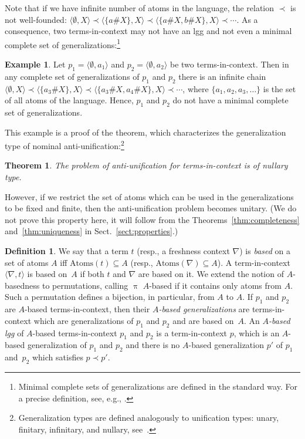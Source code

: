 \documentclass[11pt,a4paper]{amsart}
\newtheorem{theorem}{Theorem}
\theoremstyle{definition}
\newtheorem{definition}{Definition}
\newtheorem{example}{Example}
\newcommand\ppi{\uppi}
\newcommand{\np}[2]{\langle #1, \allowbreak #2\rangle}
\newcommand{\atoms}{\mathrm{Atoms}}
\begin{document}
Note that if we have infinite number of atoms in the language, the
relation $\prec$ is not well-founded: $\np{\emptyset}{X}\prec
\np{\{a\#X\}}{X}\prec \np{\{a\#X,b\#X\}}{X}\prec \cdots$. As a
consequence, two terms-in-context may not have an lgg and not even a
minimal complete set of generalizations:\footnote{Minimal complete
  sets of generalizations are defined in the standard way. For a
  precise definition, see, e.g.,
  \cite{DBLP:conf/lopstr/AlpuenteEMO08,DBLP:conf/rta/KutsiaLV11}.}

\begin{example}\label{exmp:nullary}
  Let $p_1=\np{\emptyset}{a_1}$ and $p_2=\np{\emptyset}{a_2}$ be two
  terms-in-context. Then in any complete set of generalizations of $p_1$
  and $p_2$ there is an infinite chain $\np{\emptyset}{X}\prec
  \np{\{a_3\#X\}}{X}\prec \np{\{a_3\#X,a_4\#X\}}{X}\prec \cdots$,
  where $\{a_1,a_2,a_3,\ldots\}$ is the set of all atoms
  of the language. Hence, $p_1$ and $p_2$ do not have a minimal
  complete set of generalizations.
\end{example} 

This example is a proof of the theorem, which characterizes the
generalization type of nominal
anti-unification:\footnote{Generalization types are defined
  analogously to unification types: unary, finitary,
    infinitary, and nullary, see~\cite{DBLP:conf/rta/KutsiaLV11}.}

\begin{theorem}
  \label{thm:generalization:type}
   The problem of anti-unification for terms-in-context is of nullary type.
\end{theorem}

However, if we restrict the set of atoms which can be used in the
generalizations to be fixed and finite, then the anti-unification problem
becomes unitary. (We do not prove this property here, it will follow
from the Theorems~\ref{thm:completeness} and~\ref{thm:uniqueness} in
Sect.~\ref{sect:properties}.)

\begin{definition}
We say that a term $ t$ (resp., a freshness context $\nabla$)
is \emph{based} on a set of atoms $A$ iff 
$\atoms({ t})\subseteq A$ (resp., $\atoms(\nabla)\subseteq
A$). A term-in-context $\np{\nabla}{t}$ is based on~$A$ if both
$ t$ and $\nabla$ are based on it. We extend the notion of $A$-basedness to permutations, calling $\ppi$ $A$-based if it contains only atoms from $A$. 
Such a permutation defines a bijection, in particular, from $A$ to $A$. 
If $p_1$ and $p_2$ are $A$-based
terms-in-context, then their \emph{$A$-based generalizations} are
terms-in-context which are generalizations of $p_1$ and $p_2$ and are
based on~$A$. An \emph{$A$-based lgg} of $A$-based
terms-in-context $p_1$ and $p_2$ is a term-in-context $p$, which is an
$A$-based generalization of $p_1$ and $p_2$ and there is no
$A$-based generalization $p'$ of $p_1$ and~$p_2$ which satisfies
$p\prec p'$. 
\end{definition}
\end{document}
